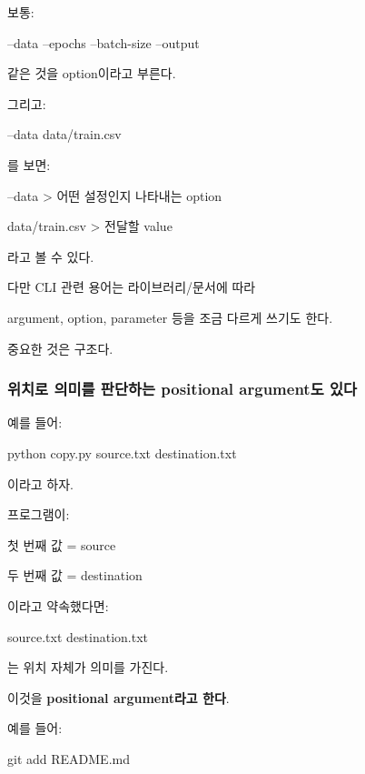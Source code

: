 보통:

\begin{dhkzsh}
--data
--epochs
--batch-size
--output
\end{dhkzsh}

같은 것을 option이라고 부른다.

그리고:

\begin{dhkzsh}
--data data/train.csv
\end{dhkzsh}

를 보면:

\begin{dhkdir}
--data
> 어떤 설정인지 나타내는 option
\end{dhkdir}
\begin{dhkdir}
data/train.csv
> 전달할 value
\end{dhkdir}


라고 볼 수 있다.

다만 CLI 관련 용어는 라이브러리/문서에 따라 

argument, option, parameter 등을 조금 다르게 쓰기도 한다. 

중요한 것은 구조다.

\subsubsection{위치로 의미를 판단하는 positional argument도 있다}

예를 들어:

\begin{dhkzsh}
python copy.py source.txt destination.txt
\end{dhkzsh}

이라고 하자.

프로그램이:

\begin{dhksmry}[centered]
첫 번째 값 = source

두 번째 값 = destination
\end{dhksmry}

이라고 약속했다면:

\begin{dhkzsh}
source.txt
destination.txt
\end{dhkzsh}

는 위치 자체가 의미를 가진다.

이것을 \textbf{positional argument라고 한다}.

예를 들어:

\begin{dhkzsh}
git add README.md
\end{dhkzsh}

